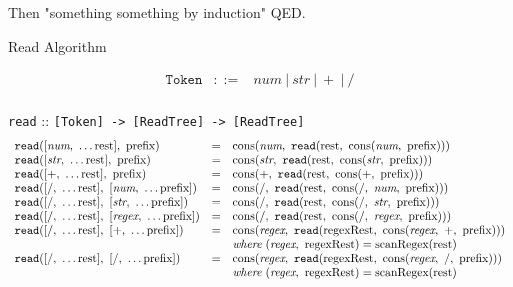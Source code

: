 \documentclass[preprint,10pt]{sigplanconf}
\begin{document}
Then "something something by induction" QED.


\begin{displayfigure*}{\label{fig:read}Read Algorithm}
  
\[
\begin{array}{rcl}
  \texttt{Token} &::=& \textit{num}~|~\textit{str}~|~+~|~/ \\
\end{array}
\]

  \texttt{read} :: \verb![Token] -> [ReadTree] -> [ReadTree]!
\[
  \begin{array}{lcl}
    \texttt{read}([\textit{num},~\ldots \textrm{rest}],~\textrm{prefix})
    &=&
    \textrm{cons}(\textit{num},~
      \texttt{read}(\textrm{rest},~
        \textrm{cons}(\textit{num},~\textrm{prefix}) 
      )
    )
    \\
    \texttt{read}([\textit{str},~\ldots \textrm{rest}],~\textrm{prefix})
    &=&
    \textrm{cons}(\textit{str},~
      \texttt{read}(\textrm{rest},~
        \textrm{cons}(\textit{str},~\textrm{prefix})
      )  
    )
    
    
    \\
    \texttt{read}([+,~\ldots \textrm{rest}],~\textrm{prefix})
    &=&
    \textrm{cons}(+,~
      \texttt{read}(\textrm{rest},~
        \textrm{cons}(+,~\textrm{prefix})
      )
    ) 
    \\
    \texttt{read}([/,~\ldots \textrm{rest}],~[\textit{num},~\ldots\textrm{prefix}])
    &=&
    \textrm{cons}(/,~
      \texttt{read}(\textrm{rest},~
        \textrm{cons}(/,~\textit{num},~\textrm{prefix}) 
      )
    )
    \\
    \texttt{read}([/,~\ldots \textrm{rest}],~[\textit{str},~\ldots\textrm{prefix}])
    &=&
    \textrm{cons}(/,~
      \texttt{read}(\textrm{rest},~
        \textrm{cons}(/,~\textit{str},~\textrm{prefix}) 
      )
    )
    \\
    \texttt{read}([/,~\ldots \textrm{rest}],~[\textit{regex},~\ldots\textrm{prefix}])
    &=&
    \textrm{cons}(/,~
      \texttt{read}(\textrm{rest},~
        \textrm{cons}(/,~\textit{regex},~\textrm{prefix}) 
      )
    )
    \\
    \texttt{read}([/,~\ldots \textrm{rest}],~[+,~\ldots\textrm{prefix}])
    &=&
    \textrm{cons}(\textit{regex},~
      \texttt{read}(\textrm{regexRest},~
        \textrm{cons}(\textit{regex},~+,~\textrm{prefix}) 
      )
    )
    \\
    && \textit{where}~(\textit{regex},~\textrm{regexRest}) = 
    \textrm{scanRegex}(\textrm{rest})
    \\
    \texttt{read}([/,~\ldots \textrm{rest}],~[/,~\ldots\textrm{prefix}])
    &=&
    \textrm{cons}(\textit{regex},~
      \texttt{read}(\textrm{regexRest},~
        \textrm{cons}(\textit{regex},~/,~\textrm{prefix}) 
      )
    )
    \\
    && \textit{where}~(\textit{regex},~\textrm{regexRest}) = 
    \textrm{scanRegex}(\textrm{rest})
  \end{array}
\]
\end{displayfigure*}
\end{document}

